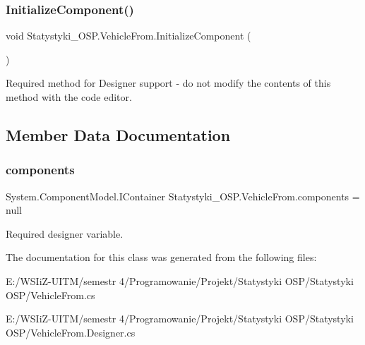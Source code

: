 \subsubsection{\texorpdfstring{InitializeComponent()}{InitializeComponent()}}
{\footnotesize\ttfamily void Statystyki\+\_\+\+O\+S\+P.\+Vehicle\+From.\+Initialize\+Component (\begin{DoxyParamCaption}{ }\end{DoxyParamCaption})\hspace{0.3cm}{\ttfamily [private]}}



Required method for Designer support -\/ do not modify the contents of this method with the code editor. 



\subsection{Member Data Documentation}
\mbox{\label{class_statystyki___o_s_p_1_1_vehicle_from_a9a58b474340ef8d0c5bbaa64e8b95dcf}} 
\subsubsection{\texorpdfstring{components}{components}}
{\footnotesize\ttfamily System.\+Component\+Model.\+I\+Container Statystyki\+\_\+\+O\+S\+P.\+Vehicle\+From.\+components = null\hspace{0.3cm}{\ttfamily [private]}}



Required designer variable. 



The documentation for this class was generated from the following files\+:\begin{DoxyCompactItemize}
\item 
E\+:/\+W\+S\+Ii\+Z-\/\+U\+I\+T\+M/semestr 4/\+Programowanie/\+Projekt/\+Statystyki O\+S\+P/\+Statystyki O\+S\+P/Vehicle\+From.\+cs\item 
E\+:/\+W\+S\+Ii\+Z-\/\+U\+I\+T\+M/semestr 4/\+Programowanie/\+Projekt/\+Statystyki O\+S\+P/\+Statystyki O\+S\+P/Vehicle\+From.\+Designer.\+cs\end{DoxyCompactItemize}
